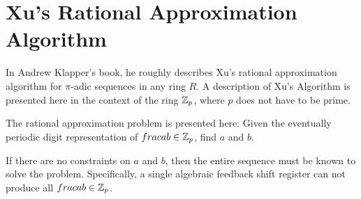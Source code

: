 \section{Xu's Rational Approximation Algorithm}
\par In Andrew Klapper's book, he roughly describes Xu's rational approximation
algorithm for $\pi$-adic sequences in any ring $R$. A description of Xu's Algorithm
is presented here in the context of the ring $\mathbb{Z}_p$, where $p$ does not have to be prime.

\par The rational approximation problem is presented here: Given the eventually
periodic digit representation of $frac{a}{b}\in\mathbb{Z}_p$, find $a$ and $b$.

\par If there are no constraints on $a$ and $b$, then the entire sequence must be known
to solve the problem. Specifically, a single algebraic feedback shift register can
not produce all $frac{a}{b}\in\mathbb{Z}_p$.
